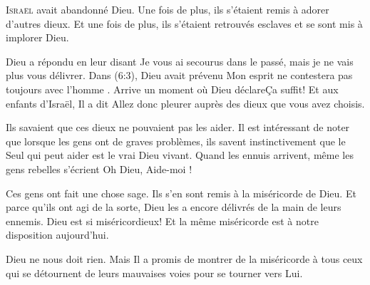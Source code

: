 

\lettrine{I}{sraël} avait abandonné Dieu.
 Une fois de plus, ils s'étaient remis à adorer d'autres dieux.
 Et une fois de plus, ils s'étaient retrouvés esclaves
 et se sont mis à implorer Dieu.

Dieu a répondu en leur disant\frcolon
 \Og Je vous ai secourus dans le passé,
 mais je ne vais plus vous délivrer. \Fg{}
 Dans (6:3), Dieu avait prévenu\frcolon
 \Og Mon esprit ne contestera pas toujours avec l'homme \Fg{}.
 Arrive un moment où Dieu déclare\frcolon \Og Ça suffit! \Fg{}
 Et aux enfants d'Israël, Il a dit\frcolon
 \Og Allez donc pleurer auprès des dieux que vous avez choisis. \Fg{}

Ils savaient que ces dieux ne pouvaient pas les aider.
 Il est intéressant de noter que lorsque les gens ont de graves problèmes,
 ils savent instinctivement que le Seul qui peut aider est le vrai Dieu vivant.
 Quand les ennuis arrivent, même les gens rebelles s'écrient\frcolon
 \Og Oh Dieu, Aide-moi ! \Fg{}


Ces gens ont fait une chose sage. Ils s'en sont remis à la miséricorde de Dieu.
 Et parce qu'ils ont agi de la sorte, Dieu les a encore délivrés
 de la main de leurs ennemis. Dieu est si miséricordieux!
 Et la même miséricorde est à notre disposition aujourd'hui.

Dieu ne nous doit rien. Mais Il a promis de montrer de la miséricorde
 à tous ceux qui se détournent de leurs mauvaises voies
 pour se tourner vers Lui. 

\dvrule






